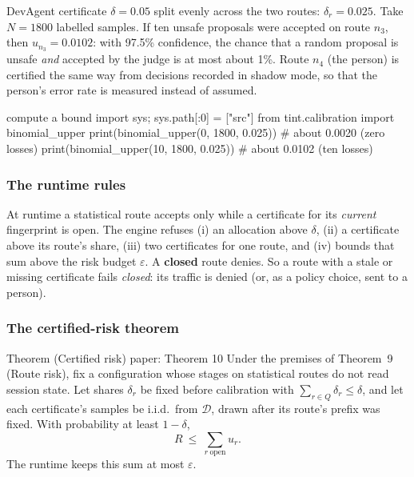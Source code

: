 \begin{example}{DevAgent certificate}
$\delta=0.05$ split evenly across the two routes: $\delta_r=0.025$. Take $N=1800$ labelled samples. If ten unsafe proposals were accepted on route $n_3$, then $u_{n_3}=0.0102$: with 97.5\% confidence, the chance that a random proposal is unsafe \emph{and} accepted by the judge is at most about 1\%. Route $n_4$ (the person) is certified the same way from decisions recorded in shadow mode, so that the person's error rate is measured instead of assumed.
\end{example}

\begin{tryit}{compute a bound}
import sys; sys.path[:0] = ["src"]
from tint.calibration import binomial_upper
print(binomial_upper(0, 1800, 0.025))    # about 0.0020 (zero losses)
print(binomial_upper(10, 1800, 0.025))   # about 0.0102 (ten losses)
\end{tryit}

\subsubsection{The runtime rules}

At runtime a statistical route accepts only while a certificate for its \emph{current} fingerprint is open. The engine refuses (i) an allocation above $\delta$, (ii) a certificate above its route's share, (iii) two certificates for one route, and (iv) bounds that sum above the risk budget $\varepsilon$. A \textbf{closed} route denies. So a route with a stale or missing certificate fails \emph{closed}: its traffic is denied (or, as a policy choice, sent to a person).

\subsubsection{The certified-risk theorem}

\begin{statement}{Theorem (Certified risk) \hfill\normalfont paper: Theorem 10}
Under the premises of Theorem~9 (Route risk), fix a configuration whose stages on statistical routes do not read session state. Let shares $\delta_r$ be fixed before calibration with $\sum_{r\in Q}\delta_r\le\delta$, and let each certificate's samples be i.i.d.\ from $\mathcal D$, drawn after its route's prefix was fixed. With probability at least $1-\delta$,
\[
R\ \le\ \sum_{r\ \text{open}}u_r.
\]
The runtime keeps this sum at most $\varepsilon$.
\end{statement}

